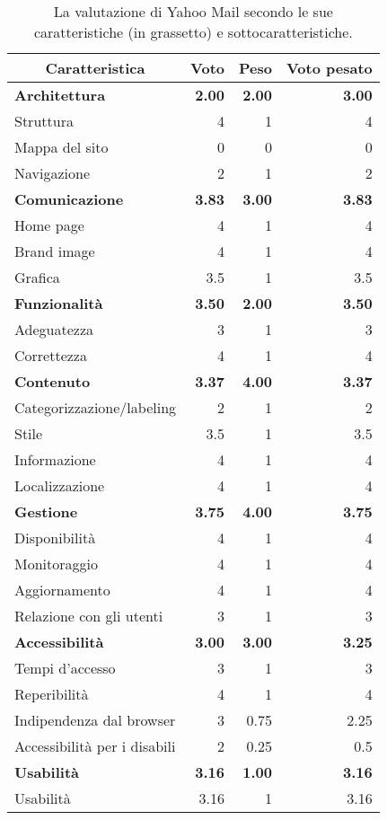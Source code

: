 		\begin{table}[h!]
			\centering
			\begin{tabular}{|l|r|r|r|}
				\hline
				\multicolumn{1}{|c|}{Caratteristica} & \multicolumn{1}{c|}{Voto} & \multicolumn{1}{c|}{Peso} & \multicolumn{1}{c|}{Voto pesato}\\ \hline\hline
				\textbf{Architettura} & \textbf{2.00} & \textbf{2.00} & \textbf{3.00}\\ \hline
				Struttura & 4 & 1 & 4\\ \hline
				Mappa del  sito & 0 & 0 & 0\\ \hline
				Navigazione & 2 & 1 & 2\\ \hline
				\textbf{Comunicazione} & \textbf{3.83} & \textbf{3.00} & \textbf{3.83}\\ \hline
				Home page & 4 & 1 & 4\\ \hline
				Brand image & 4 & 1 & 4\\ \hline
				Grafica & 3.5 & 1 & 3.5\\ \hline
				\textbf{Funzionalità} & \textbf{3.50} & \textbf{2.00} & \textbf{3.50}\\ \hline
				Adeguatezza & 3 & 1 & 3\\ \hline
				Correttezza & 4 & 1 & 4\\ \hline
				\textbf{Contenuto} & \textbf{3.37} & \textbf{4.00} & \textbf{3.37}\\ \hline
				Categorizzazione/labeling & 2 & 1 & 2\\ \hline
				Stile & 3.5 & 1 & 3.5\\ \hline
				Informazione & 4 & 1 & 4\\ \hline
				Localizzazione & 4 & 1 & 4\\ \hline
				\textbf{Gestione} & \textbf{3.75} & \textbf{4.00} & \textbf{3.75}\\ \hline
				Disponibilità & 4 & 1 & 4\\ \hline
				Monitoraggio & 4 & 1 & 4\\ \hline
				Aggiornamento & 4 & 1 & 4\\ \hline
				Relazione con gli utenti & 3 & 1 & 3\\ \hline
				\textbf{Accessibilità} & \textbf{3.00} & \textbf{3.00} & \textbf{3.25}\\ \hline
				Tempi  d'accesso & 3 & 1 & 3\\ \hline
				Reperibilità & 4 & 1 & 4\\ \hline
				Indipendenza dal browser & 3 & 0.75 & 2.25\\ \hline
				Accessibilità per i disabili & 2 & 0.25 & 0.5\\ \hline
				\textbf{Usabilità} & \textbf{3.16} & \textbf{1.00} & \textbf{3.16}\\ \hline
				Usabilità & 3.16 & 1 & 3.16\\ \hline
			\end{tabular}
			\caption[Valutazione di Yahoo Mail]{La valutazione di Yahoo Mail secondo le sue caratteristiche (in grassetto) e sottocaratteristiche.}
			\label{tab:valutazione_yahoo}
		\end{table}
		\\
		
